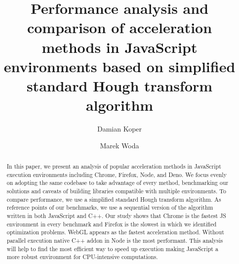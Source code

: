 \documentclass[runningheads]{llncs}
\begin{document}
%
\title{Performance analysis and comparison of acceleration methods in JavaScript environments based on simplified standard Hough transform algorithm}
%

\author{Damian Koper \and Marek Woda}
%
%
%
\maketitle              %
%
\begin{abstract}
In this paper, we present an analysis of popular acceleration methods in JavaScript execution environments including Chrome, Firefox, Node, and Deno.  We focus evenly on adopting the same codebase to take advantage of every method, benchmarking our solutions and caveats of building libraries compatible with multiple environments. To compare performance, we use a simplified standard Hough transform algorithm. As reference points of our benchmarks, we use a sequential version of the algorithm written in both JavaScript and C++. Our study shows that Chrome is the fastest JS environment in every benchmark and Firefox is the slowest in which we identified optimization problems. WebGL appears as the fastest acceleration method. Without parallel execution native C++ addon in Node is the most performant. This analysis will help to find the most efficient way to speed up execution making JavaScript a more robust environment for CPU-intensive computations.

\end{abstract}






\clearpage
 


\end{document}

